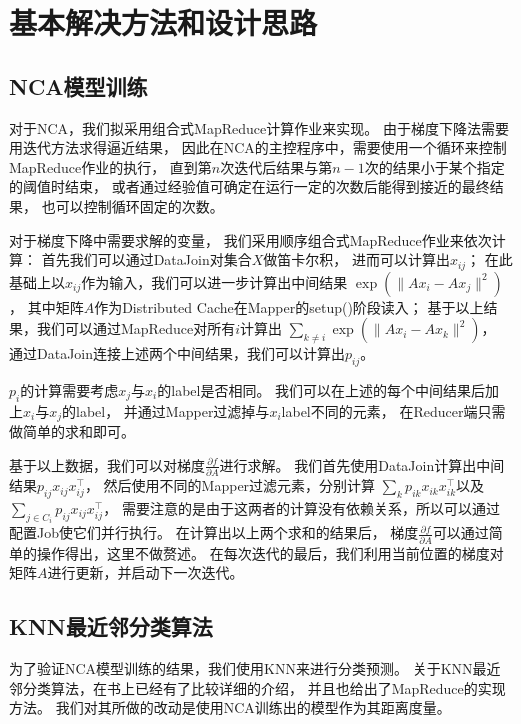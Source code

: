 

\section*{基本解决方法和设计思路}

\subsection*{NCA模型训练}

对于NCA，我们拟采用组合式MapReduce计算作业来实现。
由于梯度下降法需要用迭代方法求得逼近结果，
因此在NCA的主控程序中，需要使用一个循环来控制MapReduce作业的执行，
直到第$n$次迭代后结果与第$n-1$次的结果小于某个指定的阈值时结束，
或者通过经验值可确定在运行一定的次数后能得到接近的最终结果，
也可以控制循环固定的次数。

对于梯度下降中需要求解的变量，
我们采用顺序组合式MapReduce作业来依次计算：
首先我们可以通过DataJoin对集合$X$做笛卡尔积，
进而可以计算出$x_{ij}$；
在此基础上以$x_{ij}$作为输入，我们可以进一步计算出中间结果
$\exp(\lVert Ax_{i} - Ax_{j} \rVert^2)$，
其中矩阵$A$作为Distributed Cache在Mapper的setup()阶段读入；
基于以上结果，我们可以通过MapReduce对所有$i$计算出
$\sum_{k \neq i} \exp(\lVert Ax_{i} - Ax_{k} \rVert^2)$，
通过DataJoin连接上述两个中间结果，我们可以计算出$p_{ij}$。

$p_i$的计算需要考虑$x_j$与$x_i$的label是否相同。
我们可以在上述的每个中间结果后加上$x_i$与$x_j$的label，
并通过Mapper过滤掉与$x_i$label不同的元素，
在Reducer端只需做简单的求和即可。

基于以上数据，我们可以对梯度$\frac{\partial f}{\partial A}$进行求解。
我们首先使用DataJoin计算出中间结果$p_{ij} x_{ij} x_{ij}^\top$，
然后使用不同的Mapper过滤元素，分别计算
$\sum_{k} p_{ik} x_{ik} x_{ik}^\top$以及$\sum_{j \in C_i} p_{ij} x_{ij} x_{ij}^\top$，
需要注意的是由于这两者的计算没有依赖关系，所以可以通过配置Job使它们并行执行。
在计算出以上两个求和的结果后，
梯度$\frac{\partial f}{\partial A}$可以通过简单的操作得出，这里不做赘述。
在每次迭代的最后，我们利用当前位置的梯度对矩阵$A$进行更新，并启动下一次迭代。

\subsection*{KNN最近邻分类算法}

为了验证NCA模型训练的结果，我们使用KNN来进行分类预测。
关于KNN最近邻分类算法，在书上已经有了比较详细的介绍，
并且也给出了MapReduce的实现方法。
我们对其所做的改动是使用NCA训练出的模型作为其距离度量。


